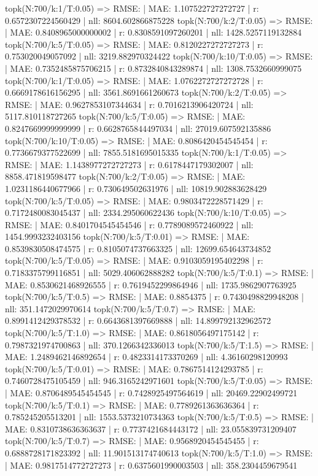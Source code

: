 topk(N:700/k:1/T:0.05) => RMSE: | MAE: 1.107522727272727 | r: 0.6572307224560429 | nll: 8604.602866875228
topk(N:700/k:2/T:0.05) => RMSE: | MAE: 0.8408965000000002 | r: 0.8308591097260201 | nll: 1428.5257119132884
topk(N:700/k:5/T:0.05) => RMSE: | MAE: 0.8120227272727273 | r: 0.753020049057092 | nll: 3219.882970324422
topk(N:700/k:10/T:0.05) => RMSE: | MAE: 0.7352485875706215 | r: 0.8732840843289874 | nll: 1308.7532660999075
topk(N:700/k:1/T:0.05) => RMSE: | MAE: 1.0762272727272728 | r: 0.6669178616156295 | nll: 3561.8691661260673
topk(N:700/k:2/T:0.05) => RMSE: | MAE: 0.9627853107344634 | r: 0.7016213906420724 | nll: 5117.810118727265
topk(N:700/k:5/T:0.05) => RMSE: | MAE: 0.8247669999999999 | r: 0.6628765844497034 | nll: 27019.607592135886
topk(N:700/k:10/T:0.05) => RMSE: | MAE: 0.8086420454545454 | r: 0.7736679377522699 | nll: 7855.5181695015335
topk(N:700/k:1/T:0.05) => RMSE: | MAE: 1.1438977272727273 | r: 0.6178447179302007 | nll: 8858.471819598477
topk(N:700/k:2/T:0.05) => RMSE: | MAE: 1.0231186440677966 | r: 0.730649502631976 | nll: 10819.902883628429
topk(N:700/k:5/T:0.05) => RMSE: | MAE: 0.9803472228571429 | r: 0.7172480083045437 | nll: 2334.295060622436
topk(N:700/k:10/T:0.05) => RMSE: | MAE: 0.8401704545454546 | r: 0.7789089572460922 | nll: 1454.9993232403156
topk(N:700/k:5/T:0.01) => RMSE: | MAE: 0.8539830508474575 | r: 0.8105074737663325 | nll: 12699.654643734852
topk(N:700/k:5/T:0.05) => RMSE: | MAE: 0.9103059195402298 | r: 0.7183375799116851 | nll: 5029.406062888282
topk(N:700/k:5/T:0.1) => RMSE: | MAE: 0.8530621468926555 | r: 0.7619452299864946 | nll: 1735.9862907763925
topk(N:700/k:5/T:0.5) => RMSE: | MAE: 0.8854375 | r: 0.7430498829948208 | nll: 351.1472029970614
topk(N:700/k:5/T:0.7) => RMSE: | MAE: 0.8991412429378532 | r: 0.6643681397669888 | nll: 14.899792132962572
topk(N:700/k:5/T:1.0) => RMSE: | MAE: 0.8618056497175142 | r: 0.7987321974700863 | nll: 370.1266342336013
topk(N:700/k:5/T:1.5) => RMSE: | MAE: 1.2489462146892654 | r: 0.4823314173370269 | nll: 4.36160298120993
topk(N:700/k:5/T:0.01) => RMSE: | MAE: 0.7867514124293785 | r: 0.7460728475105459 | nll: 946.3165242971601
topk(N:700/k:5/T:0.05) => RMSE: | MAE: 0.8706489545454545 | r: 0.7428925497564619 | nll: 20469.22902499721
topk(N:700/k:5/T:0.1) => RMSE: | MAE: 0.7789261363636364 | r: 0.785245205513201 | nll: 1553.5373210734363
topk(N:700/k:5/T:0.5) => RMSE: | MAE: 0.8310738636363637 | r: 0.7737421684443172 | nll: 23.055839731209407
topk(N:700/k:5/T:0.7) => RMSE: | MAE: 0.9568920454545455 | r: 0.6888728171823392 | nll: 11.901513174740613
topk(N:700/k:5/T:1.0) => RMSE: | MAE: 0.9817514772727273 | r: 0.6375601990003503 | nll: 358.2304459679541
